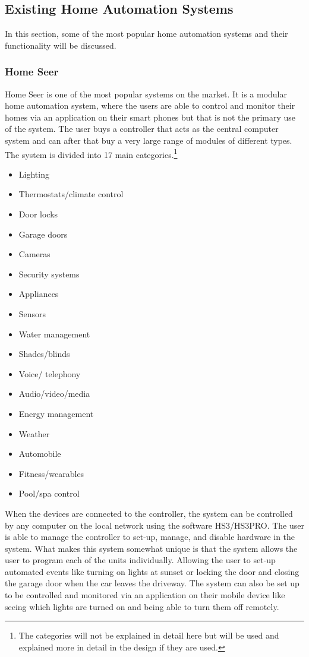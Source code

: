 \subsection{Existing Home Automation Systems}
\label{sub:existingSystems}
In this section, some of the most popular home automation systems and their functionality will be discussed.

\subsubsection{Home Seer}
Home Seer is one of the most popular systems on the market. It is a modular home automation system, where the users are able to control and monitor their homes via an application on their smart phones but that is not the primary use of the system. The user buys a controller that acts as the central computer system and can after that buy a very large range of modules of different types. The system is divided into 17 main categories\cite{compatible_products}.\footnote{The categories will not be explained in detail here but will be used and explained more in detail in the design if they are used.}
\begin{itemize}
	\item Lighting
	\item Thermostats/climate control
	\item Door locks
	\item Garage doors
	\item Cameras
	\item Security systems
	\item Appliances
	\item Sensors
	\item Water management
	\item Shades/blinds
	\item Voice/ telephony
	\item Audio/video/media
	\item Energy management
	\item Weather
	\item Automobile
	\item Fitness/wearables
	\item Pool/spa control
\end{itemize}
When the devices are connected to the controller, the system can be controlled by any computer on the local network using the software HS3/HS3PRO. The user is able to manage the controller to set-up, manage, and disable hardware in the system. What makes this system somewhat unique is that the system allows the user to program each of the units individually. Allowing the user to set-up automated events like turning on lights at sunset or locking the door and closing the garage door when the car leaves the driveway. The system can also be set up to be controlled and monitored via an application on their mobile device like seeing which lights are turned on and being able to turn them off remotely\cite{quick_guide}.

